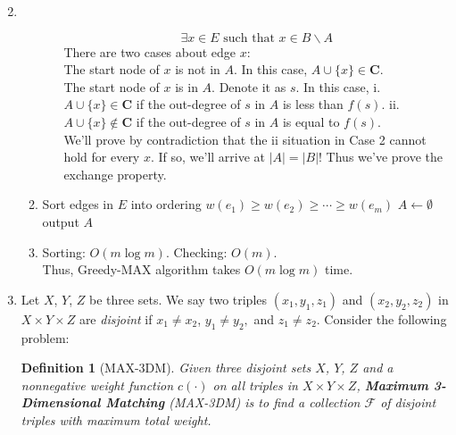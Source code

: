 \documentclass[12pt,a4paper]{article}
\makeatletter
\newtheorem*{solution}{Solution}
\newtheorem{definition}{Definition}
\theoremstyle{definition}
\renewenvironment{solution}[1][Solution] {\par\pushQED{\qed}\normalfont\topsep6\p@\@plus6\p@\relax\trivlist\item[\hskip\labelsep\bfseries#1\@addpunct{.}]\ignorespaces}{\popQED\endtrivlist\@endpefalse} \makeatother
\makeatother
\begin{document}
\begin{enumerate}
\begin{solution}
\begin{enumerate}[label = (\alph*)]
\begin{itemize}
				\[\exists x \in E \text{ such that } x \in B \backslash A \]
				There are two cases about edge $x$: \\
				 The start node of $x$ is not in $A$.  In this case, $A \cup \{x\} \in \mathbf{C}$. \\
				 The start node of $x$ is in $A$. Denote it as $s$. In this case, i. $A \cup \{x\} \in \mathbf{C}$ if the out-degree of $s$ in $A$ is less than $f(s)$. ii. $A \cup \{x\} \notin \mathbf{C}$ if the out-degree of $s$ in $A$ is equal to $f(s)$. \\
				We'll prove by contradiction that the ii situation in Case 2 cannot hold for every $x$. If so, we'll arrive at $| A | = | B |$! Thus we've prove the exchange property.
			\end{itemize}
			\item 
			\begin{minipage}[t]{0.9\textwidth}
				\begin{algorithm}[H]
					\caption{Greedy-MAX}
					
					Sort edges in $E$ into ordering $w(e_1) \geq w(e_2) \geq \cdots \geq w(e_m)$\;
					$A \leftarrow \emptyset$\;
					output $A$\;
				\end{algorithm}
			\end{minipage}
			\item
			Sorting: $O(m \log m)$. Checking: $O(m)$. \\
			Thus, Greedy-MAX algorithm takes $O(m \log m)$ time.
		\end{enumerate}
	\end{solution}


\item Let $X$, $Y$, $Z$ be three sets. We say two triples $\left(x_{1}, y_{1}, z_{1}\right)$ and $\left(x_{2}, y_{2}, z_{2}\right)$ in $X \times Y \times Z$ are \textit{disjoint} if $x_{1} \neq x_{2}$, $y_{1} \neq y_{2},$ and $z_{1} \neq z_{2}$. Consider the following problem:
    
    \begin{definition}[MAX-3DM] 
        Given three disjoint sets $X$, $Y$, $Z$ and a nonnegative weight function $c(\cdot)$ on all triples in $X \times Y \times Z$, \textbf{Maximum 3-Dimensional Matching} (MAX-3DM) is to find a collection $\mathcal{F}$ of disjoint triples with maximum total weight.
    \end{definition}


\end{enumerate}
\end{document}
